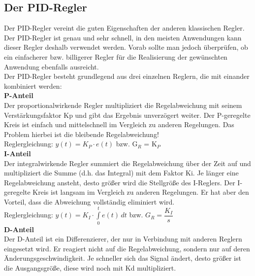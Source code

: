 \subsection{Der PID-Regler}
Der PID-Regler vereint die guten Eigenschaften der anderen klassischen Regler. Der PID-Regler ist genau und sehr schnell, in den meisten Anwendungen kann dieser Regler deshalb verwendet werden. Vorab sollte man jedoch überprüfen, ob ein einfacherer bzw. billigerer Regler für die Realisierung der gewünschten Anwendung ebenfalls ausreicht.
\\[5mm]
Der PID-Regler besteht grundlegend aus drei einzelnen Reglern, die mit einander kombiniert werden:
\\[5mm]
\textbf{P-Anteil}\\[1mm]
Der proportionalwirkende Regler multipliziert die Regelabweichung mit seinem Verstärkungsfaktor Kp und gibt das Ergebnis unverzögert weiter. Der P-geregelte Kreis ist einfach und mittelschnell im Vergleich zu anderen Regelungen. Das Problem hierbei ist die bleibende Regelabweichung!
\\[4mm]
Reglergleichung: \hspace{5mm} $y(t) = K_P \cdot e(t)$ \hspace{5mm} bzw. \hspace{5mm} G$_R$ = K$_P$
\\[7mm]

\textbf{I-Anteil}\\[1mm]
Der integralwirkende Regler summiert die Regelabweichung über der Zeit auf und multipliziert die Summe (d.h. das Integral) mit dem Faktor Ki. Je länger eine Regelabweichung ansteht, desto größer wird die Stellgröße des I-Reglers. Der I-geregelte Kreis ist langsam im Vergleich zu anderen Regelungen. Er hat aber den Vorteil, dass die Abweichung vollständig eliminiert wird.
\\[4mm]
Reglergleichung: \hspace{5mm} $y(t) = K_I \cdot \int\limits_{0}^{t} e(t) \,dt$ \hspace{5mm} bzw. \hspace{5mm} $G_R = \dfrac{K_I}{s}$
\\[7mm]

\textbf{D-Anteil}\\[1mm]
Der D-Anteil ist ein Differenzierer, der nur in Verbindung mit anderen Reglern eingesetzt wird. Er reagiert nicht auf die Regelabweichung, sondern nur auf deren Änderungsgeschwindigkeit. Je schneller sich das Signal ändert, desto größer ist die Ausgangsgröße, diese wird noch mit Kd multipliziert.

